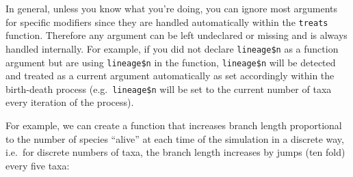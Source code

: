\documentclass[
]{book}
\begin{document}
In general, unless you know what you're doing, you can ignore most arguments for specific modifiers since they are handled automatically within the \texttt{treats} function.
Therefore any argument can be left undeclared or missing and is always handled internally. For example, if you did not declare \texttt{lineage\$n} as a function argument but are using \texttt{lineage\$n} in the function, \texttt{lineage\$n} will be detected and treated as a current argument automatically as set accordingly within the birth-death process (e.g.~\texttt{lineage\$n} will be set to the current number of taxa every iteration of the process).

For example, we can create a function that increases branch length proportional to the number of species ``alive'' at each time of the simulation in a discrete way, i.e.~for discrete numbers of taxa, the branch length increases by jumps (ten fold) every five taxa:
\end{document}

